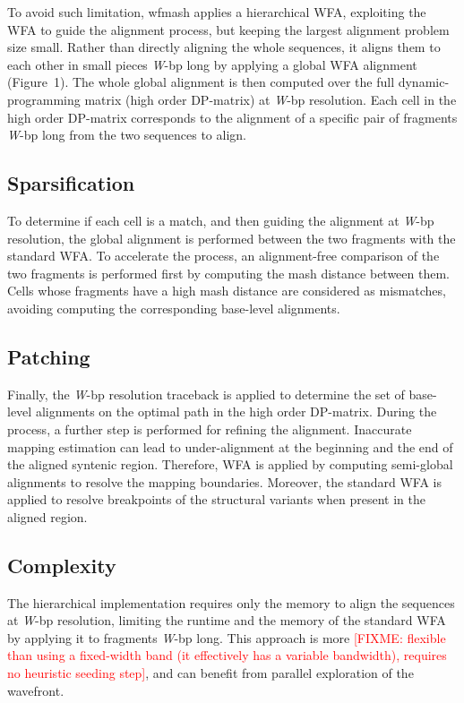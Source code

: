 \documentclass{bioinfo}
\theoremstyle{definition}
\newcommand{\red}[1]{{\textcolor{Red}{#1}}}
\newcommand{\FIXME}[1]{\red{[FIXME: #1]}}
\begin{document}
To avoid such limitation, wfmash applies a hierarchical WFA, exploiting the WFA to guide the alignment process, but keeping the largest alignment problem size small.
Rather than directly aligning the whole sequences, it aligns them to each other in small pieces \textit{W}-bp long by applying a global WFA alignment (Figure~1\vphantom{\ref{fig:1}}).
The whole global alignment is then computed over the full dynamic-programming matrix (high order DP-matrix) at \textit{W}-bp resolution.
Each cell in the high order DP-matrix corresponds to the alignment of a specific pair of fragments \textit{W}-bp long from the two sequences to align.



\subsection{Sparsification}
To determine if each cell is a match, and then guiding the alignment at \textit{W}-bp resolution, the global alignment is performed between the two fragments with the standard WFA.
To accelerate the process, an alignment-free comparison of the two fragments is performed first by computing the mash distance between them.
Cells whose fragments have a high mash distance are considered as mismatches, avoiding computing the corresponding base-level alignments.

\subsection{Patching}
Finally, the \textit{W}-bp resolution traceback is applied to determine the set of base-level alignments on the optimal path in the high order DP-matrix.
During the process, a further step is performed for refining the alignment.
Inaccurate mapping estimation can lead to under-alignment at the beginning and the end of the aligned syntenic region.
Therefore, WFA is applied by computing semi-global alignments to resolve the mapping boundaries.
Moreover, the standard WFA is applied to resolve breakpoints of the structural variants when present in the aligned region.

\subsection{Complexity}
The hierarchical implementation requires only the memory to align the sequences at \textit{W}-bp resolution, limiting the runtime and the memory of the standard WFA by applying it to fragments \textit{W}-bp long.
This approach is more \FIXME{flexible than using a fixed-width band (it effectively has a variable bandwidth), requires no heuristic seeding step}, and can benefit from parallel exploration of the wavefront.
\\
\end{document}
